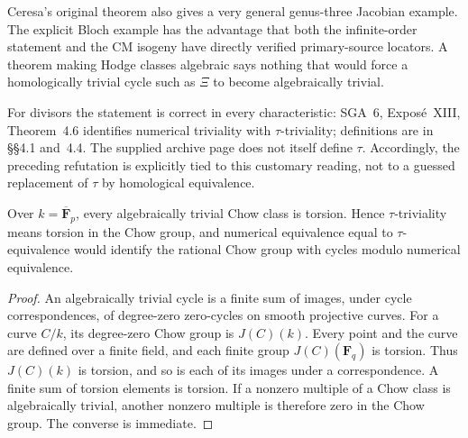 Ceresa's original theorem also gives a very general genus-three
Jacobian example.  The explicit Bloch example has the advantage that
both the infinite-order statement and the CM isogeny have directly
verified primary-source locators.  A theorem making Hodge classes
algebraic says nothing that would force a homologically trivial
cycle such as $\Xi$ to become algebraically trivial.

For divisors the statement is correct in every characteristic:
SGA~6, Expos\'e~XIII, Theorem~4.6 identifies numerical triviality
with $\tau$-triviality; definitions are in \S\S4.1 and~4.4.
The supplied archive page does not itself define $\tau$.  Accordingly,
the preceding refutation is explicitly tied to this customary reading,
not to a guessed replacement of $\tau$ by homological equivalence.

\begin{lemma}
\label{jac:P06}
Over $k=\overline{\mathbf F}_p$, every algebraically trivial Chow class
is torsion.  Hence $\tau$-triviality means torsion in the Chow group,
and numerical equivalence equal to $\tau$-equivalence would identify
the rational Chow group with cycles modulo numerical equivalence.
\end{lemma}

\begin{proof}
An algebraically trivial cycle is a finite sum of images, under cycle
correspondences, of degree-zero zero-cycles on smooth projective curves.
For a curve $C/k$, its degree-zero Chow group is $J(C)(k)$.  Every
point and the curve are defined over a finite field, and each finite
group $J(C)(\mathbf F_q)$ is torsion.  Thus $J(C)(k)$ is torsion,
and so is each of its images under a correspondence.  A finite sum of
torsion elements is torsion.  If a nonzero multiple of a Chow class
is algebraically trivial, another nonzero multiple is therefore zero
in the Chow group.  The converse is immediate.
\end{proof}
